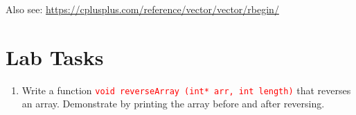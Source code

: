 \documentclass[12pt]{article}
\begin{document}
\vspace{1cm}

\noindent Also see: \url{https://cplusplus.com/reference/vector/vector/rbegin/}


















































































\newpage
{}
\part*{\centering Lab Tasks}

\begin{enumerate}

\item Write a function \textcolor{red}{\texttt{void reverseArray (int* arr, int length)}} that reverses an array. Demonstrate by printing the array before and after reversing.


\end{enumerate}
\end{document}
